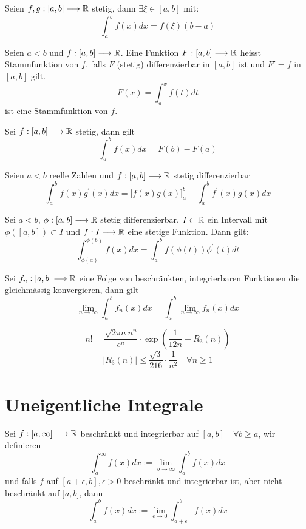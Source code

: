 \Satz[Mittelwertsatz] Seien $f,g : [a,b] \longrightarrow \mathbb{R}$ stetig, dann $\exists \xi \in [a,b]$ mit:
$$\int_a^b f(x) dx = f(\xi)(b-a)$$


\Satz[Stammfunktion] Seien $a < b$ und $f : [a,b] \longrightarrow \mathbb{R}$. Eine Funktion $F : [a,b] \longrightarrow \mathbb{R}$  heisst Stammfunktion von $f$, falls $F$ (stetig) differenzierbar in $[a,b]$ ist und $F' = f$ in $[a,b]$ gilt. \\
$$F(x) = \int_a^x f(t) dt$$ ist eine Stammfunktion von $f$.

\Satz[Fundamentalsatz] Sei $f : [a,b] \longrightarrow \mathbb{R}$ stetig, dann gilt
$$\int_a^b f(x) dx = F(b)-F(a)$$

 Seien $a < b$ reelle Zahlen und $f : [a,b] \longrightarrow \mathbb{R}$ stetig differenzierbar
$$
\int_{a}^{b} f(x) g^{\prime}(x) dx = \Big[f(x)g(x)\Big]_a^b - \int_{a}^{b} f^{\prime}(x) g(x) dx
$$

\Satz[Substitution] Sei $a<b$, $\phi : [a,b] \longrightarrow \mathbb{R}$ stetig differenzierbar, $I \subset \mathbb{R}$ ein Intervall mit $\phi([a,b]) \subset I$ und $f: I \longrightarrow \mathbb{R}$ eine stetige Funktion. Dann gilt:
$$
\int_{\phi(a)}^{\phi(b)} f(x) dx=\int_{a}^{b} f(\phi(t)) \phi^{\prime}(t) dt
$$

\Satz Sei $f_n : [a,b] \longrightarrow \mathbb{R}$ eine Folge von beschränkten, integrierbaren Funktionen die gleichmässig konvergieren, dann gilt
$$
\lim_{n \rightarrow \infty} \int_a^b f_n(x) dx = \int_a^b \lim_{n \rightarrow \infty} f_n(x) dx
$$

\Satz[Stirling] 
$$
n !=\frac{\sqrt{2 \pi n} n^{n}}{e^{n}} \cdot \exp \left(\frac{1}{12 n}+R_{3}(n)\right)
$$
$$
\left|R_{3}(n)\right| \leqslant \frac{\sqrt{3}}{216} \cdot \frac{1}{n^{2}} \quad \forall n \geqslant 1
$$

\section{Uneigentliche Integrale}

\Def Sei $f:[a,\infty] \longrightarrow \mathbb{R}$ beschränkt und integrierbar auf $[a,b] \quad \forall b \geq a$, wir definieren
$$\int_a^\infty f(x) dx := \lim_{b \rightarrow \infty} \int_a^b f(x) dx$$
und falls $f$ auf $[a+\epsilon,b], \epsilon>0$ beschränkt und integrierbar ist, aber nicht beschränkt auf $]a,b]$, dann
$$\int_a^b f(x) dx := \lim_{\epsilon \rightarrow 0} \int_{a+\epsilon}^b f(x) dx$$

